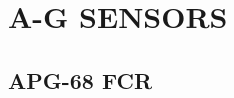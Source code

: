 \chapter[A-G SENSORS --- WIP]{A-G SENSORS}
\localtableofcontents
\thispagestyle{plain}
\cleardoublepage

\section{APG-68 FCR}
\label{sec:fcr-ag}






